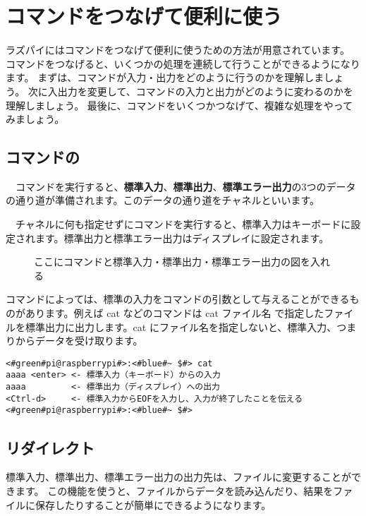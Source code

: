\newpage
\section{コマンドをつなげて便利に使う}
ラズパイにはコマンドをつなげて便利に使うための方法が用意されています。
コマンドをつなげると、いくつかの処理を連続して行うことができるようになります。
まずは、コマンドが入力・出力をどのように行うのかを理解しましょう。
次に入出力を変更して、コマンドの入力と出力がどのように変わるのかを理解しましょう。
最後に、コマンドをいくつかつなげて、複雑な処理をやってみましょう。

\subsection{コマンドの}
　コマンドを実行すると、{\bf 標準入力}、{\bf 標準出力}、{\bf 標準エラー出力}の3つのデータの通り道が準備されます。このデータの通り道をチャネルといいます。

　チャネルに何も指定せずにコマンドを実行すると、標準入力はキーボードに設定されます。標準出力と標準エラー出力はディスプレイに設定されます。

\begin{figure}
    \vspace{5cm}
    \caption{ここにコマンドと標準入力・標準出力・標準エラー出力の図を入れる}
    \label{ch03:stdioerr}
\end{figure}

コマンドによっては、標準の入力をコマンドの引数として与えることができるものがあります。例えば cat などのコマンドは cat ファイル名 で指定したファイルを標準出力に出力します。cat にファイル名を指定しないと、標準入力、つまりからデータを受け取ります。

\begin{lstlisting}[caption=catの標準入力・標準出力, label=stdioCat]
<#green#pi@raspberrypi#>:<#blue#~ $#> cat 
aaaa <enter> <- 標準入力（キーボード）からの入力
aaaa         <- 標準出力（ディスプレイ）への出力
<Ctrl-d>     <- 標準入力からEOFを入力し、入力が終了したことを伝える
<#green#pi@raspberrypi#>:<#blue#~ $#>
\end{lstlisting}


\subsection{リダイレクト}
標準入力、標準出力、標準エラー出力の出力先は、ファイルに変更することができます。
この機能を使うと、ファイルからデータを読み込んだり、結果をファイルに保存したりすることが簡単にできるようになります。

